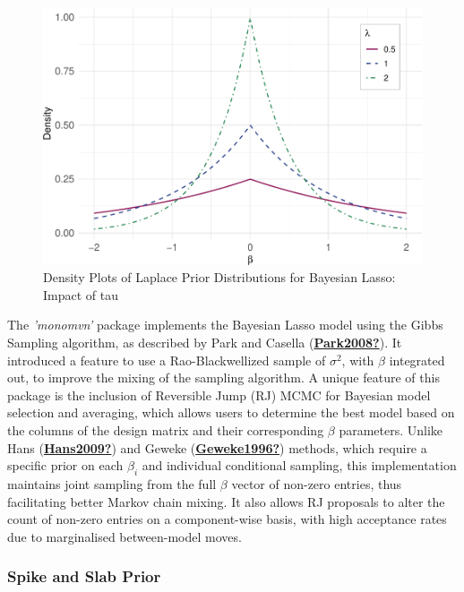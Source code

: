 \documentclass[
  11pt,
]{article}
\begin{document}
\begin{figure}

{\centering \includegraphics[width=0.85\linewidth]{dissertation_files/figure-latex/Bayesian Lasso Priors-1} 

}

\caption{Density Plots of Laplace Prior Distributions for Bayesian Lasso: Impact of tau}\label{fig:Bayesian Lasso Priors}
\end{figure}

The \emph{'monomvn'} package implements the Bayesian Lasso model using
the Gibbs Sampling algorithm, as described by Park and Casella
(\protect\hyperlink{ref-Park2008}{\textbf{Park2008?}}). It introduced a
feature to use a Rao-Blackwellized sample of \(\sigma^2\), with
\(\beta\) integrated out, to improve the mixing of the sampling
algorithm. A unique feature of this package is the inclusion of
Reversible Jump (RJ) MCMC for Bayesian model selection and averaging,
which allows users to determine the best model based on the columns of
the design matrix and their corresponding \(\beta\) parameters. Unlike
Hans (\protect\hyperlink{ref-Hans2009}{\textbf{Hans2009?}}) and Geweke
(\protect\hyperlink{ref-Geweke1996}{\textbf{Geweke1996?}}) methods,
which require a specific prior on each \(\beta_i\) and individual
conditional sampling, this implementation maintains joint sampling from
the full \(\beta\) vector of non-zero entries, thus facilitating better
Markov chain mixing. It also allows RJ proposals to alter the count of
non-zero entries on a component-wise basis, with high acceptance rates
due to marginalised between-model moves.

\subsubsection{Spike and Slab Prior}
\end{document}
